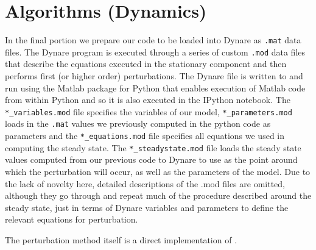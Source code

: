 \documentclass[11pt]{article}
\newcommand{\code}[1]{\texttt{#1}}
\begin{document}
 \section{Algorithms (Dynamics)} 
In the final portion we prepare our code to be loaded into Dynare as \code{.mat} data files. The Dynare program is executed through a series of custom \code{.mod} data files that describe the equations executed in the stationary component and then performs first (or higher order) perturbations. The Dynare file is written to and run using the Matlab package for Python that enables execution of Matlab code from within Python and so it is also executed in the IPython notebook. The \code{*\_variables.mod} file specifies the variables of our model, \code{*\_parameters.mod} loads in the \code{.mat} values we previously computed in the python code as parameters and the \code{*\_equations.mod} file specifies all equations we used in computing the steady state. The \code{*\_steadystate.mod} file loads the steady state values computed from our previous code to Dynare to use as the point around which the perturbation will occur, as well as the parameters of the model.
Due to the lack of novelty here, detailed descriptions of the .mod files are omitted, although they go through and repeat much of the procedure described around the steady state, just in terms of Dynare variables and parameters to define the relevant equations for perturbation. \par The perturbation method itself is a direct implementation of \cite{Schmitt-Grohe2004}. 
\end{document}
